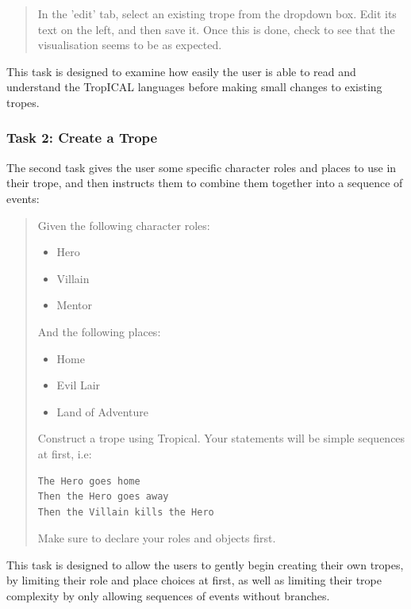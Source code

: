 \documentclass[11pt]{report}
\begin{document}
\begin{framed}
\begin{quote}
In the 'edit' tab, select an existing trope from the dropdown box. Edit its text on the left, and then save it. Once this is done, check to see that the visualisation seems to be as expected.
\end{quote}
\end{framed}

This task is designed to examine how easily the user is able to read and
understand the TropICAL languages before making small changes to existing tropes.

\subsubsection*{Task 2: Create a Trope}
\label{sec:org96a6276}

The second task gives the user some specific character roles and places to use
in their trope, and then instructs them to combine them together into a sequence
of events:

\begin{framed}
\begin{quote}
Given the following character roles:

\begin{itemize}
\item Hero
\item Villain
\item Mentor
\end{itemize}

And the following places:

\begin{itemize}
\item Home
\item Evil Lair
\item Land of Adventure
\end{itemize}

Construct a trope using Tropical. Your statements will be simple sequences at first, i.e:

\begin{verbatim}
The Hero goes home
Then the Hero goes away
Then the Villain kills the Hero
\end{verbatim}

Make sure to declare your roles and objects first.
\end{quote}
\end{framed}

This task is designed to allow the users to gently begin creating their own
tropes, by limiting their role and place choices at first, as well as limiting
their trope complexity by only allowing sequences of events without branches.
\end{document}
